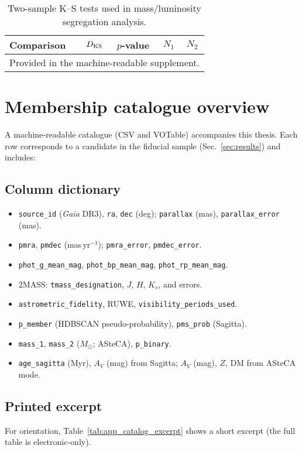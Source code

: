 \documentclass[../main.tex]{subfiles}
\begin{document}
\begin{table*}[h]
  \centering
  \caption{Two-sample K--S tests used in mass/luminosity segregation analysis.}
  \label{tab:app_ks}
  \begin{tabular}{lcccc}
    \toprule
    Comparison & $D_{\rm KS}$ & $p$-value & $N_1$ & $N_2$\\
    \midrule
    \multicolumn{5}{c}{Provided in the machine-readable supplement.}\\
    \bottomrule
  \end{tabular}
\end{table*}

\clearpage

\section{Membership catalogue overview}
\label{app:catalogue}

A machine-readable catalogue (CSV and VOTable) accompanies this thesis. Each row corresponds to a candidate in the fiducial sample (Sec.~\ref{sec:results}) and includes:

\subsection*{Column dictionary}
\begin{itemize}
  \item \texttt{source\_id} (\textit{Gaia} DR3), \texttt{ra}, \texttt{dec} (deg); \texttt{parallax} (mas), \texttt{parallax\_error} (mas).
  \item \texttt{pmra}, \texttt{pmdec} (mas\,yr$^{-1}$); \texttt{pmra\_error}, \texttt{pmdec\_error}.
  \item \texttt{phot\_g\_mean\_mag}, \texttt{phot\_bp\_mean\_mag}, \texttt{phot\_rp\_mean\_mag}.
  \item 2MASS: \texttt{tmass\_designation}, $J$, $H$, $K_s$, and errors.
  \item \texttt{astrometric\_fidelity}, RUWE, \texttt{visibility\_periods\_used}.
  \item \texttt{p\_member} (HDBSCAN pseudo-probability), \texttt{pms\_prob} (Sagitta).
  \item \texttt{mass\_1}, \texttt{mass\_2} ($M_\odot$; ASteCA), \texttt{p\_binary}.
  \item \texttt{age\_sagitta} (Myr), $A_V$ (mag) from Sagitta; $A_V$ (mag), $Z$, DM from ASteCA mode.
\end{itemize}

\subsection*{Printed excerpt}
For orientation, Table~\ref{tab:app_catalog_excerpt} shows a short excerpt (the full table is electronic-only).
\end{document}
